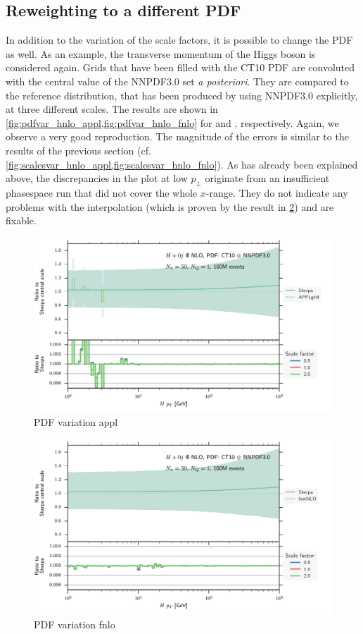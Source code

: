 \subsection{Reweighting to a different PDF}
In addition to the variation of the scale factors, it is possible to change the PDF as well.
As an example, the transverse momentum of the Higgs boson is considered again.
Grids that have been filled with the CT10 PDF are convoluted with the central value of the NNPDF3.0 set \textit{a posteriori}.
They are compared to the reference distribution, that has been produced by \sherpa{} using NNPDF3.0 explicitly, at three different scales.
The results are shown in \cref{fig:pdfvar_hnlo_appl,fig:pdfvar_hnlo_fnlo} for \appl{} and \fnlo{}, respectively.
Again, we observe a very good reproduction.
The magnitude of the errors is similar to the results of the previous section (cf. \cref{fig:scalesvar_hnlo_appl,fig:scalesvar_hnlo_fnlo}).
As has already been explained above, the discrepancies in the \appl{} plot at low $p_\perp$ originate from an insufficient phasespace run that did not cover the whole $x$-range.
They do not indicate any problems with the interpolation (which is proven by the \fnlo{} result in \cref{fig:pdfvar_hnlo_fnlo}) and are fixable.
%
\begin{figure}
	\centering
	\includegraphics[width=\textwidth]{images/pdfvar_hnlo_appl.pdf}
	\caption{PDF variation appl}
	\label{fig:pdfvar_hnlo_appl}
\end{figure}
%
\begin{figure}
	\centering
	\includegraphics[width=\textwidth]{images/pdfvar_hnlo_fnlo.pdf}
	\caption{PDF variation fnlo}
	\label{fig:pdfvar_hnlo_fnlo}
\end{figure}
%

